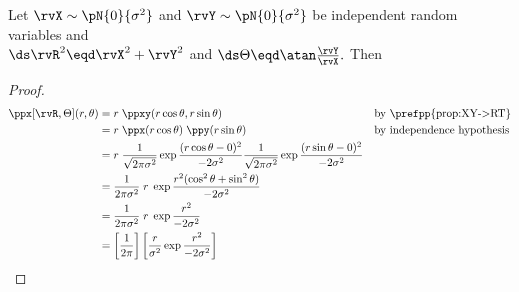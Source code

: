 \begin{proposition}
\label{prop:XY->RT_n}
Let $\rvX\sim\pN{0}{\sigma^2}$ and $\rvY\sim\pN{0}{\sigma^2}$ be
independent random variables and
\\$\ds\rvR^2 \eqd \rvX^2 + \rvY^2$ and $\ds\Theta \eqd \atan\frac{\rvY}{\rvX}.$
\quad Then
\end{proposition}
\begin{proof}
\begin{align*}
  \ppx[\rvR,\Theta](r,\theta)
    &= r\;\ppxy(r\cos\theta,r\sin\theta)
    && \text{by \prefpp{prop:XY->RT}}
  \\&= r\;\ppx(r\cos\theta) \; \ppy(r\sin\theta)
    && \text{by independence hypothesis}
  \\&= r\;
       \frac{1}{\sqrt{2\pi\sigma^2}}\exp{\frac{(r\cos\theta-0)^2}{-2\sigma^2}}
       \frac{1}{\sqrt{2\pi\sigma^2}}\exp{\frac{(r\sin\theta-0)^2}{-2\sigma^2}}
  \\&= \frac{1}{2\pi\sigma^2}\;r\;
       \exp{\frac{r^2(\cos^2\theta + \sin^2\theta)}{-2\sigma^2}}
  \\&= \frac{1}{2\pi\sigma^2}\;r\;
       \exp{\frac{r^2}{-2\sigma^2}}
  \\&= \left[\frac{1}{2\pi}\right]
       \left[\frac{r}{\sigma^2}\exp{\frac{r^2}{-2\sigma^2}}\right]
\end{align*}
\end{proof}


